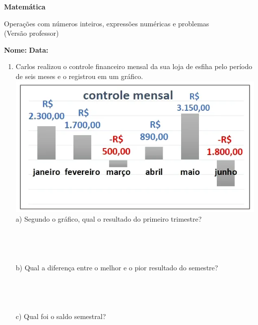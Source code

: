 \documentclass[a4paper,14pt]{article}
\begin{document}
	
	\noindent\textbf{Matemática} 
	
	\begin{center}Operações com números inteiros, expressões numéricas e problemas \\ (Versão professor)
	\end{center}
	
	\noindent\textbf{Nome:} \underline{\hspace{10cm}}
	\noindent\textbf{Data:} \underline{\hspace{4cm}}
	
	
	
    \begin{multicols}{2}
		\begin{enumerate}
			\item Carlos realizou o controle financeiro mensal da sua loja de esfiha pelo período de seis meses e o registrou em um gráfico.
			\includegraphics[width=1\linewidth]{Leonardo_imagens/imagem1}
			a) Segundo o gráfico, qual o resultado do primeiro trimestre?\\\\\\\\\\
			
			b) Qual a diferença entre o melhor e o pior resultado do semestre?\\\\\\\\\\
			
			c) Qual foi o saldo semestral?\\\\\\\\\\\\\\
			

\end{enumerate}
\end{multicols}
\end{document}
